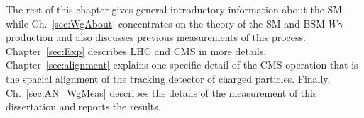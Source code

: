 The rest of this chapter gives general introductory information about the SM while Ch.~\ref{sec:WgAbout} concentrates on the theory of the SM and BSM $W\gamma$ production and also discusses previous measurements of this process. Chapter~\ref{sec:Exp} describes LHC and CMS in more details. Chapter~\ref{sec:alignment} explains one specific detail of the CMS operation that is the spacial alignment of the tracking detector of charged particles. Finally, Ch.~\ref{sec:AN_WgMeas} describes the details of the measurement of this dissertation and reports the results.\\ 

%
%
%
%
%
%
